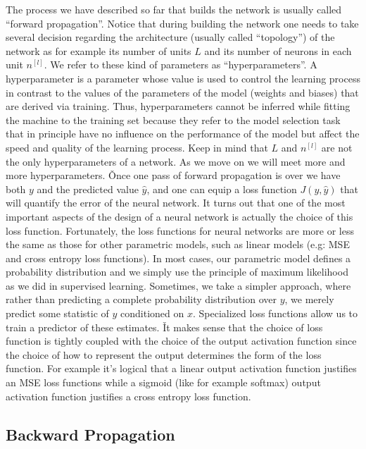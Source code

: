 The process we have described so far that builds the network is usually called ``forward propagation''. Notice that
during building the network one needs to take several decision regarding the architecture (usually called
``topology'') of the network as for example its number of units $L$ and its number of neurons in each unit $n^{[l]}$.
We refer to these kind of parameters as ``hyperparameters''. A hyperparameter is a parameter whose value is used to
control the learning process in contrast to the values of the parameters of the model (weights and biases) that are
derived via training. Thus, hyperparameters cannot be inferred while fitting the machine to the training set because
they refer to the model selection task that in principle have no influence on the performance of the model but affect
the speed and quality of the learning process. Keep in mind that $L$ and $n^{[l]}$ are not the only hyperparameters
of a network. As we move on we will meet more and more hyperparameters. \v

Once one pass of forward propagation is over we have both $y$ and the predicted value $\hat{y}$, and one can equip a
loss function $J(y, \hat{y})$ that will quantify the error of the neural network. It turns out that one of the most
important aspects of the design of a neural network is actually the choice of this loss function. Fortunately, the
loss functions for neural networks are more or less the same as those for other parametric models, such as linear
models (e.g: MSE and cross entropy loss functions). In most cases, our parametric model defines a probability
distribution and we simply use the principle of maximum likelihood as we did in supervised learning. Sometimes, we
take a simpler approach, where rather than predicting a complete probability distribution over $y$, we merely predict
some statistic of $y$ conditioned on $x$. Specialized loss functions allow us to train a predictor of these estimates. \v

It makes sense that the choice of loss function is tightly coupled with the choice of the output activation function
since the choice of how to represent the output determines the form of the loss function. For example it's logical
that a linear output activation function justifies an MSE loss functions while a sigmoid (like for example softmax)
output activation function justifies a cross entropy loss function.

\subsection{Backward Propagation}

